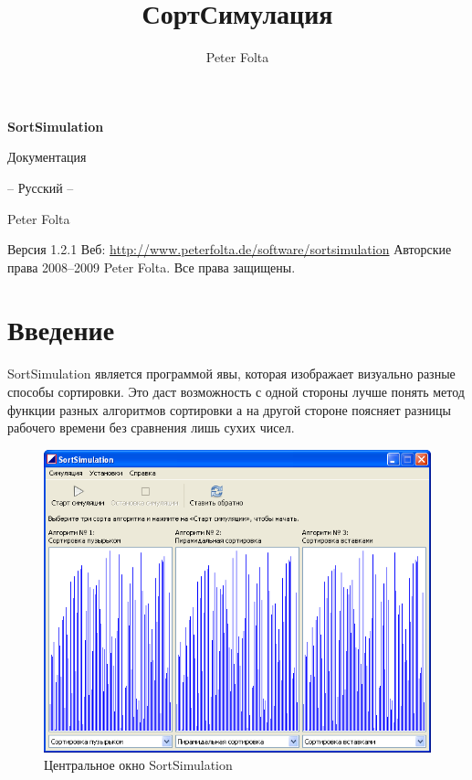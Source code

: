 \documentclass[11pt, a4paper, titlepage, twoside]{article}
\title{СортСимулация}
\author{Peter Folta}
\newcommand{\version}{1.2.1}
\begin{document}
	
	\begin{titlepage}
		\begin{center}
			\vspace*{2.5cm}
			\Huge{\textbf{SortSimulation}}
			
			\vspace*{1.5cm}
			\LARGE{Документация}
			
			\Large{-- Русский --}
			
			\vspace*{3.75cm}
			\Large{Peter Folta}
		\end{center}
		
		\vspace*{8cm}
		\noindent{}Версия \version\newline{}
		Веб: \href{http://www.peterfolta.de/software/sortsimulation}{http://www.peterfolta.de/software/sortsimulation}\newline{}
		Авторские права 2008--2009 Peter Folta. Все права защищены.
	\end{titlepage}
	
	\setcounter{page}{2}
	
	\cleardoublepage{}
	\tableofcontents{}
	\newpage{}
	
	
	\section{Введение}
	
	SortSimulation является программой явы, которая изображает визуально разные способы сортировки. Это даст возможность с одной стороны лучше понять метод функции разных алгоритмов сортировки а на другой стороне поясняет разницы рабочего времени без сравнения лишь сухих чисел.
	
	\begin{figure}[h]
		\begin{center}
			\includegraphics[scale=0.6]{images/image0.png}
			\caption{Центральное окно SortSimulation}
		\end{center}
	\end{figure}
	
\end{document}
